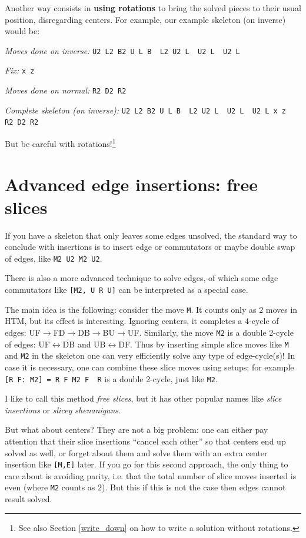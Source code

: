 \documentclass[11pt,a4paper]{book}
\newcommand{\p}{\textquotesingle}
\newcommand{\m}{\texttt}
\newcommand{\ps}{\p\,\,}
\begin{document}
Another way consists in \textbf{using rotations} to bring the solved pieces to their usual position, disregarding centers. For example, our example skeleton (on inverse) would be:

\vspace{0.2cm}
\emph{Moves done on inverse:} \m{U2 L2 B2 U L B\ps L2 U2 L\ps U2 L\ps U2 L}

\emph{Fix:} \m{x z\p}

\emph{Moves done on normal:} \m{R2 D2 R2}

\emph{Complete skeleton (on inverse):} \m{U2 L2 B2 U L B\ps L2 U2 L\ps U2 L\ps U2 L x z\ps R2 D2 R2}
\vspace{0.2cm}

But be careful with rotations!\footnote{See also Section \ref{write_down} on how to write a solution without rotations.}

\section{Advanced edge insertions: free slices}
\label{slices}

If you have a skeleton that only leaves some edges unsolved, the standard way to conclude with insertions is to insert edge or commutators or maybe double swap of edges, like \m{M2 U2 M2 U2}.

There is also a more advanced technique to solve edges, of which some edge commutators like \m{[M2, U R U\p]} can be interpreted as a special case. 

The main idea is the following: consider the move \m{M}. It counts only as $2$ moves in HTM, but its effect is interesting. Ignoring centers, it completes a $4$-cycle of edges: UF$\to$FD$\to$DB$\to$BU$\to$UF. Similarly, the move \m{M2} is a double 2-cycle of edges: UF$\leftrightarrow$DB and UB$\leftrightarrow$DF. Thus by inserting simple slice moves like \m{M} and \m{M2} in the skeleton one can very efficiently solve any type of edge-cycle(s)! In case it is necessary, one can combine these slice moves using setups; for example \m{[R F: M2] = R F M2 F\ps R\p} is a double 2-cycle, just like \m{M2}.

I like to call this method \emph{free slices}, but it has other popular names like \emph{slice insertions} or \emph{slicey shenanigans}.

But what about centers? They are not a big problem: one can either pay attention that their slice insertions ``cancel each other'' so that centers end up solved as well, or forget about them and solve them with an extra center insertion like \m{[M,E]} later. If you go for this second approach, the only thing to care about is avoiding parity, i.e. that the total number of slice moves inserted is even (where \m{M2} counts as $2$). But this if this is not the case then edges cannot result solved.
\end{document}
